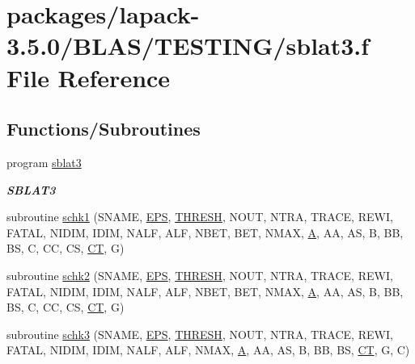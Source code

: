 \hypertarget{sblat3_8f}{}\section{packages/lapack-\/3.5.0/\+B\+L\+A\+S/\+T\+E\+S\+T\+I\+N\+G/sblat3.f File Reference}
\label{sblat3_8f}
\subsection*{Functions/\+Subroutines}
\begin{DoxyCompactItemize}
\item 
program \hyperlink{group__single__blas__testing_gaeec1d20ed538f1a0d9a200b8c8747fd2}{sblat3}
\begin{DoxyCompactList}\small\item\em {\bfseries S\+B\+L\+A\+T3} \end{DoxyCompactList}\item 
subroutine \hyperlink{sblat3_8f_a30a4ceda48eefff13734aeae8a451140}{schk1} (S\+N\+A\+M\+E, \hyperlink{tukey_8c_a6ebf6899d6c1c8b7b9d09be872c05aae}{E\+P\+S}, \hyperlink{zlaqgs_8c_a0656018abfc9fa2821827415f5d5ea57}{T\+H\+R\+E\+S\+H}, N\+O\+U\+T, N\+T\+R\+A, T\+R\+A\+C\+E, R\+E\+W\+I, F\+A\+T\+A\+L, N\+I\+D\+I\+M, I\+D\+I\+M, N\+A\+L\+F, A\+L\+F, N\+B\+E\+T, B\+E\+T, N\+M\+A\+X, \hyperlink{classA}{A}, A\+A, A\+S, B, B\+B, B\+S, C, C\+C, C\+S, \hyperlink{tau_8h_ae9ab3801c1afb4f20cfd669d76aec283}{C\+T}, G)
\item 
subroutine \hyperlink{sblat3_8f_a3597737138b45ecc8c7cbb2bee691334}{schk2} (S\+N\+A\+M\+E, \hyperlink{tukey_8c_a6ebf6899d6c1c8b7b9d09be872c05aae}{E\+P\+S}, \hyperlink{zlaqgs_8c_a0656018abfc9fa2821827415f5d5ea57}{T\+H\+R\+E\+S\+H}, N\+O\+U\+T, N\+T\+R\+A, T\+R\+A\+C\+E, R\+E\+W\+I, F\+A\+T\+A\+L, N\+I\+D\+I\+M, I\+D\+I\+M, N\+A\+L\+F, A\+L\+F, N\+B\+E\+T, B\+E\+T, N\+M\+A\+X, \hyperlink{classA}{A}, A\+A, A\+S, B, B\+B, B\+S, C, C\+C, C\+S, \hyperlink{tau_8h_ae9ab3801c1afb4f20cfd669d76aec283}{C\+T}, G)
\item 
subroutine \hyperlink{sblat3_8f_aa9175f36775378b28d6c23e177f5bac3}{schk3} (S\+N\+A\+M\+E, \hyperlink{tukey_8c_a6ebf6899d6c1c8b7b9d09be872c05aae}{E\+P\+S}, \hyperlink{zlaqgs_8c_a0656018abfc9fa2821827415f5d5ea57}{T\+H\+R\+E\+S\+H}, N\+O\+U\+T, N\+T\+R\+A, T\+R\+A\+C\+E, R\+E\+W\+I, F\+A\+T\+A\+L, N\+I\+D\+I\+M, I\+D\+I\+M, N\+A\+L\+F, A\+L\+F, N\+M\+A\+X, \hyperlink{classA}{A}, A\+A, A\+S, B, B\+B, B\+S, \hyperlink{tau_8h_ae9ab3801c1afb4f20cfd669d76aec283}{C\+T}, G, C)

\end{DoxyCompactItemize}
